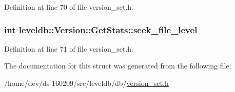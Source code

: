 Definition at line 70 of file version\+\_\+set.\+h.

\hypertarget{structleveldb_1_1_version_1_1_get_stats_a6cd952d5850faf00c7d45f79973a76d4}{}
\subsubsection[{seek\+\_\+file\+\_\+level}]{\setlength{\rightskip}{0pt plus 5cm}int leveldb\+::\+Version\+::\+Get\+Stats\+::seek\+\_\+file\+\_\+level}\label{structleveldb_1_1_version_1_1_get_stats_a6cd952d5850faf00c7d45f79973a76d4}


Definition at line 71 of file version\+\_\+set.\+h.



The documentation for this struct was generated from the following file\+:\begin{DoxyCompactItemize}
\item 
/home/dev/ds-\/160209/src/leveldb/db/\hyperlink{version__set_8h}{version\+\_\+set.\+h}\end{DoxyCompactItemize}

